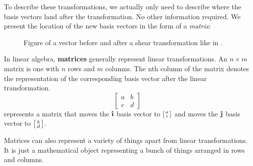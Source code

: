 To describe these transformations, we actually only need to describe where the basis vectors land after the transformation. No other information required. We present the location of the new basis vectors in the form of a \emph{matrix}:
\begin{figure}
  \centering
  \caption{Figure of a vector before and after a shear transformation like in .}
  \label{shearveca}
\end{figure}
\begin{definition}
  In linear algebra, \textbf{matrices} generally represent linear transformations. An \(n \times m\) matrix is one with \(n\) rows and \(m\) columns. The nth column of the matrix denotes the representation of the corresponding basis vector after the  linear transformation.
  \begin{equation*}
    \begin{bmatrix}
      a & b \\
      c & d
    \end{bmatrix}
  \end{equation*}
  represents a matrix that moves the \(\ihat\) basis vector to \(\begin{bsmallmatrix}
    a \\
    c
  \end{bsmallmatrix} \) and moves the \(\jhat\) basis vector to \(\begin{bsmallmatrix}
    b \\
    d
  \end{bsmallmatrix} \).
\end{definition}
\begin{remark}
  Matrices can also represent a variety of things apart from linear transformations. It is just a mathematical object representing a bunch of things arranged in rows and columns.
\end{remark}

